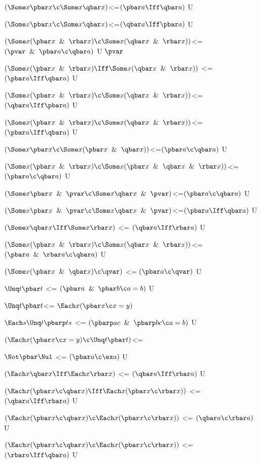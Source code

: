$(\Some x \pbar x \c \Some x\qbar x)$<=$(\pbar a \Iff\qbar a)$ U

$(\Some x \pbar x \c \Some x\qbar x)$<=$(\qbar a \Iff\pbar a)$ U

$(\Some x(\pbar x \And \rbar x) \c \Some x(\qbar x \And \rbar x))$<=$(\pvar \And \pbar a\c\qbar a)$ U $\pvar$

$(\Some x (\pbar x \And \rbar x)\Iff \Some x(\qbar x\And\rbar x))$ <= $(\pbar a \Iff \qbar a)$ U

$(\Some x(\pbar x \And \rbar x) \c \Some x(\qbar x \And \rbar x))$<=$(\qbar a\Iff\pbar a)$ U

$(\Some x(\pbar x \And \rbar x) \c \Some x(\qbar x \And \rbar x))$<=$(\pbar a\Iff\qbar a)$ U

$(\Some x \pbar x \c \Some x (\pbar x \And \qbar x))$<=$(\pbar a \c \qbar a)$ U

$(\Some x (\pbar x \And \rbar x) \c \Some x (\pbar x \And \qbar x \And \rbar x))$<= $(\pbar a \c \qbar a)$ U

$(\Some x \pbar x \And \pvar\c \Some x \qbar x\And \pvar)$<=$(\pbar a \c \qbar a)$ U

$(\Some x \pbar x \And \pvar\c \Some x \qbar x\And \pvar)$<=$(\pbar a \Iff \qbar a)$ U

$(\Some x  \qbar x \Iff \Some x  \rbar x)$ <= $(\qbar a \Iff \rbar a)$ U

$(\Some x(\pbar x \And \rbar x) \c \Some x(\qbar x \And \rbar x))$<= $(\pbar a \And \rbar a \c \qbar a)$ U

$(\Some x (\pbar x \And \qbar x)\c  \qvar)$ <=  $(\pbar a \c \qvar)$ U

$\Unq t \pbar t$ <= $(\pbar a \And \pbar b \c a = b)$ U

$\Unq t \pbar t$<= $\Each x(\pbar x \c x = y)$

$\Each s\Unq t \pbarp ts$ <= $(\pbarp ac \And \pbarp bc \c a = b)$ U

$(\Each x (\pbar x \c x = y)\c \Unq t \pbar t )$<= 

$\Not \pbar\Nul$ <= $(\pbar a \c \ex a)$ U

$(\Each x  \qbar x \Iff \Each x  \rbar x)$ <= $(\qbar a \Iff \rbar a)$ U

$(\Each x (\pbar x \c \qbar x) \Iff \Each x (\pbar x \c \rbar x))$ <= $(\qbar a \Iff \rbar a)$ U

$(\Each x (\pbar x \c \qbar x) \c \Each x (\pbar x \c \rbar x))$ <= $(\qbar a \c \rbar a)$ U

$(\Each x (\pbar x \c \qbar x) \c \Each x (\pbar x \c \rbar x))$ <= $(\rbar a \Iff \qbar a)$ U

